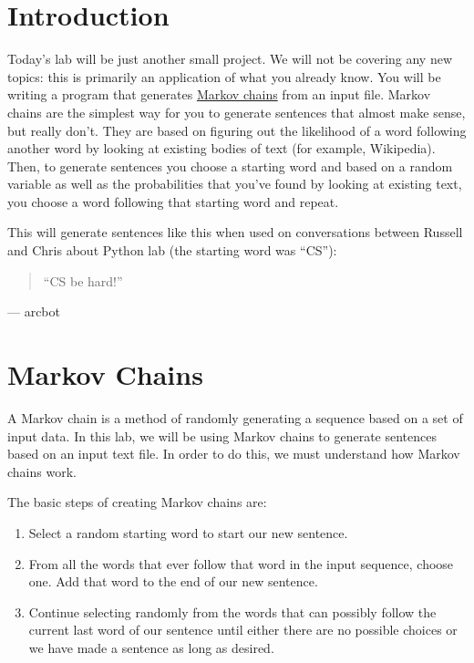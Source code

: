 \documentclass[11pt]{cselabheader}
\begin{document}
\section{Introduction}

Today's lab will be just another small project.
We will not be covering any new
topics: this is primarily an application of what you already know. You will be
writing a program that generates
\href{http://en.wikipedia.org/wiki/Markov_chain}{Markov chains} from an input
file. Markov chains are the simplest way for you to generate sentences that
almost make sense, but really don't. They are based on figuring out the
likelihood of a word following another word by looking at existing bodies of
text (for example, Wikipedia). Then, to generate sentences you choose a starting
word and based on a random variable as well as the probabilities that you've
found by looking at existing text, you choose a word following that starting
word and repeat. 

This will generate sentences like this when used on conversations between
Russell and Chris about Python lab (the starting word was ``CS''):
\begin{quotation}
``CS be hard!''
\end{quotation}
\begin{flushright}
--- arcbot
\end{flushright}
\pagebreak

\section{Markov Chains}
\label{sec:markov}

A Markov chain is a method of randomly generating a sequence based on a set of input data. In this lab, we will be using Markov chains to generate sentences based on an input text file. In order to do this, we must understand how Markov chains work.

The basic steps of creating Markov chains are:
\begin{enumerate}
\item Select a random starting word to start our new sentence.
\item From all the words that ever follow that word in the input sequence, choose one. Add that word to the end of our new sentence.
\item Continue selecting randomly from the words that can possibly follow the current last word of our sentence until either there are no possible choices or we have made a sentence as long as desired.
\end{enumerate}
\end{document}
